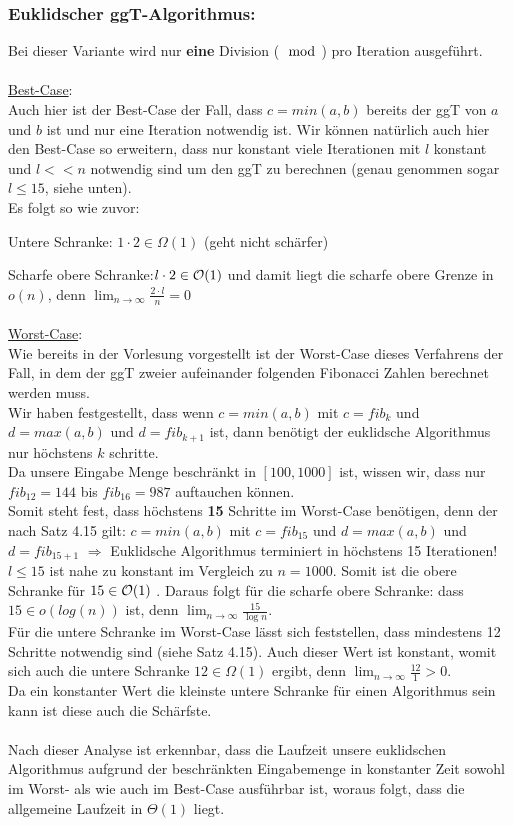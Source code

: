 \documentclass{llncs}
\begin{document}
\subsubsection*{Euklidscher ggT-Algorithmus:}
Bei dieser Variante wird nur \textbf{eine} Division ($\mod$) pro Iteration ausgeführt.\\\\
\underline{Best-Case}:\\
Auch hier ist der Best-Case der Fall, dass $c=min(a,b)$ bereits der ggT von $a$ und $b$ ist und nur eine Iteration notwendig ist. Wir können natürlich auch hier den Best-Case so erweitern, dass nur konstant viele Iterationen mit $l$ konstant und $l << n$ notwendig sind um den ggT zu berechnen (genau genommen sogar $l\le 15$, siehe unten).\\
Es folgt so wie zuvor: 

Untere Schranke: $1\cdot 2 \in \Omega(1)$ (geht nicht schärfer)

Scharfe obere Schranke:$l\cdot 2 \in \mathcal{O}(1)$ und damit liegt die scharfe obere Grenze in $o(n)$, denn $\lim_{n\to\infty}{\frac{2\cdot l}{n}}=0$\\\\
\underline{Worst-Case}:\\
Wie bereits in der Vorlesung vorgestellt ist der Worst-Case dieses Verfahrens der Fall, in dem der ggT zweier aufeinander folgenden Fibonacci Zahlen berechnet werden muss.\\
Wir haben festgestellt, dass wenn $c=min(a,b)$ mit $c=fib_k$ und $d=max(a,b)$ und $d=fib_{k+1}$ ist, dann benötigt der euklidsche Algorithmus nur höchstens $k$ schritte.\\
Da unsere Eingabe Menge beschränkt in $[100,1000]$ ist, wissen wir, dass nur $fib_{12}=144$ bis  $fib_{16}=987$ auftauchen können.\\
Somit steht fest, dass höchstens \textbf{15} Schritte im Worst-Case benötigen, denn der nach Satz 4.15 gilt: $c=min(a,b)$ mit $c=fib_15$ und $d=max(a,b)$ und $d=fib_{15+1}$ $\Rightarrow$ Euklidsche Algorithmus terminiert in höchstens 15 Iterationen!\\
$l\le 15$ ist nahe zu konstant im Vergleich zu $n=1000$.
Somit ist die obere Schranke für $15\in \mathcal{O}(1)$ . Daraus folgt für die scharfe obere Schranke: dass $15 \in o(log(n))$ ist, denn $\lim_{n\to\infty}{\frac{15}{\log{n}}}$.\\
Für die untere Schranke im Worst-Case lässt sich feststellen, dass mindestens 12 Schritte notwendig sind (siehe Satz 4.15). Auch dieser Wert ist konstant, womit sich auch die untere Schranke $12\in\Omega(1)$ ergibt, denn $\lim_{n\to\infty}{\frac{12}{1}}>0$.\\
Da ein konstanter Wert die kleinste untere Schranke für einen Algorithmus sein kann ist diese auch die Schärfste.\\
\\
Nach dieser Analyse ist erkennbar, dass die Laufzeit unsere euklidschen Algorithmus aufgrund der beschränkten Eingabemenge in konstanter Zeit sowohl im Worst- als wie auch im Best-Case ausführbar ist, woraus folgt, dass die allgemeine Laufzeit in $\Theta(1)$ liegt.
\end{document}
